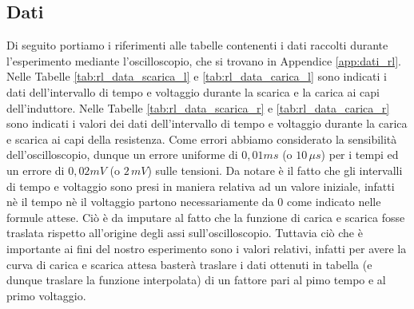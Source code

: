 \documentclass[a4paper]{article}
\begin{document}
\subsection{Dati}
Di seguito portiamo i riferimenti alle tabelle contenenti i dati raccolti durante l'esperimento mediante l'oscilloscopio, che si trovano in Appendice \ref{app:dati_rl}.
Nelle Tabelle \ref{tab:rl_data_scarica_l} e \ref{tab:rl_data_carica_l} sono indicati i dati dell'intervallo di tempo e voltaggio durante la scarica e la carica ai capi dell'induttore.
Nelle Tabelle \ref{tab:rl_data_scarica_r} e \ref{tab:rl_data_carica_r} sono indicati i valori dei dati dell'intervallo di tempo e voltaggio durante la carica e scarica ai capi della resistenza.
Come errori abbiamo considerato la sensibilità dell'oscilloscopio, dunque un errore uniforme di \( 0,01 ms \) (o \( 10 \, \mu s \)) per i tempi ed un errore di \( 0,02mV \) (o \( 2 \, mV \)) sulle tensioni.
Da notare è il fatto che gli intervalli di tempo e voltaggio sono presi in maniera relativa ad un valore iniziale, infatti nè il tempo nè il voltaggio partono necessariamente da \( \mathit{0} \) come indicato nelle formule attese. Ciò è da imputare al fatto che la funzione di carica e scarica fosse traslata rispetto all'origine degli assi sull'oscilloscopio. Tuttavia ciò che è importante ai fini del nostro esperimento sono i valori relativi, infatti per avere la curva di carica e scarica attesa basterà traslare i dati ottenuti in tabella (e dunque traslare la funzione interpolata) di un fattore pari al pimo tempo e al primo voltaggio.

\end{document}
